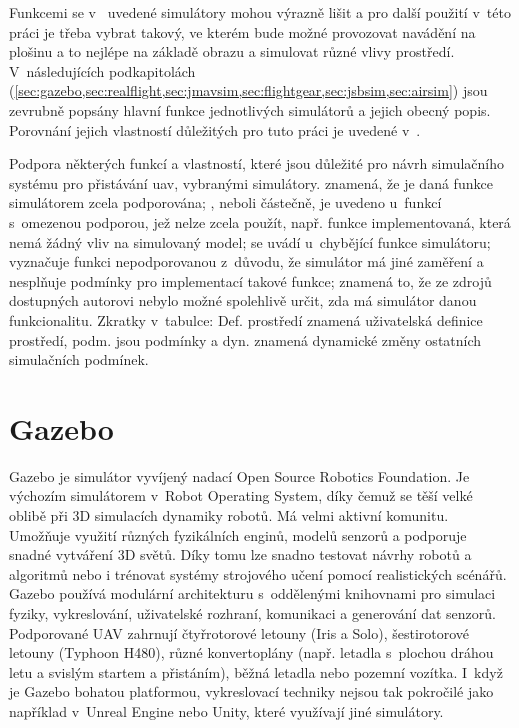     Funkcemi se v~ uvedené simulátory mohou výrazně lišit a pro další použití v~této práci je třeba vybrat takový, ve kterém bude možné provozovat navádění na plošinu a to nejlépe na základě obrazu a simulovat různé vlivy prostředí. V~následujících podkapitolách (\cref{sec:gazebo,sec:realflight,sec:jmavsim,sec:flightgear,sec:jsbsim,sec:airsim}) jsou zevrubně popsány hlavní funkce jednotlivých simulátorů a jejich obecný popis. Porovnání jejich vlastností důležitých pro tuto práci je uvedené v~.

    \begin{table}
        \centering
        
        \caption[Vlastnosti vybraných simulátorů]{Podpora některých funkcí a vlastností, které jsou důležité pro návrh simulačního systému pro přistávání \acrshort{uav}, vybranými simulátory.  znamená, že je daná funkce simulátorem zcela podporována; , neboli částečně, je uvedeno u~funkcí s~omezenou podporou, jež nelze zcela použít, např. funkce implementovaná, která nemá žádný vliv na simulovaný model;  se uvádí u~chybějící funkce simulátoru; \uv{-} vyznačuje funkci nepodporovanou z~důvodu, že simulátor má jiné zaměření a nesplňuje podmínky pro implementací takové funkce;  znamená to, že ze zdrojů dostupných autorovi nebylo možné spolehlivě určit, zda má simulátor danou funkcionalitu. Zkratky v~tabulce: Def. prostředí znamená uživatelská definice prostředí, podm. jsou podmínky a dyn. znamená dynamické změny ostatních simulačních podmínek.}
        \label{tab:simsfeatures}
    \end{table}

    \section{Gazebo} \label{sec:gazebo}
        Gazebo je simulátor vyvíjený nadací Open Source Robotics Foundation. Je výchozím simulátorem v~Robot Operating System, díky čemuž se těší velké oblibě při 3D simulacích dynamiky robotů. Má velmi aktivní komunitu. Umožňuje využití různých fyzikálních enginů, modelů senzorů a podporuje snadné vytváření 3D světů. Díky tomu lze snadno testovat návrhy robotů a algoritmů nebo i trénovat systémy strojového učení pomocí realistických scénářů. Gazebo používá modulární architekturu s~oddělenými knihovnami pro simulaci fyziky, vykreslování, uživatelské rozhraní, komunikaci a generování dat senzorů. Podporované UAV zahrnují čtyřrotorové letouny (Iris a Solo), šestirotorové letouny (Typhoon H480), různé konvertoplány (např. letadla s~plochou dráhou letu a svislým startem a přistáním), běžná letadla nebo pozemní vozítka. I~když je Gazebo bohatou platformou, vykreslovací techniky nejsou tak pokročilé jako například v~Unreal Engine nebo Unity, které využívají jiné simulátory. \cite{Ebeid2018}
    
